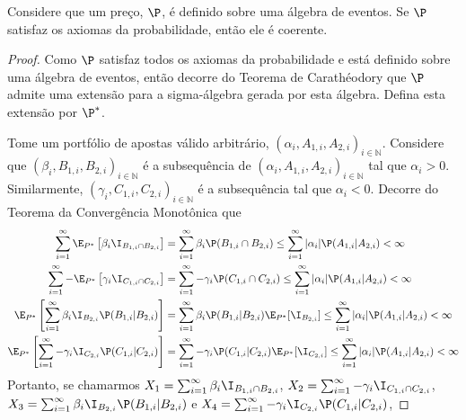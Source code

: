 \begin{lemma}
 \label{lemma:coherence_countable}
 Considere que um preço, $\P$, é 
 definido sobre uma álgebra de eventos.
 Se $\P$ satisfaz os axiomas da probabilidade, então 
 ele é coerente.
\end{lemma}

\begin{proof}
 Como $\P$ satisfaz todos os axiomas da probabilidade e
 está definido sobre uma álgebra de eventos, 
 então decorre do Teorema de Carathéodory
 \citep{Billingsley1986} que 
 $\P$ admite uma extensão para 
 a sigma-álgebra gerada por esta álgebra.
 Defina esta extensão por $\P^{*}$.
 
 Tome um portfólio de apostas válido arbitrário,
 $(\alpha_{i},A_{1,i},A_{2,i})_{i \in \mathbb{N}}$.
 Considere que 
 $(\beta_{i},B_{1,i},B_{2,i})_{i \in \mathbb{N}}$ é 
 a subsequência de 
 $(\alpha_{i},A_{1,i},A_{2,i})_{i \in \mathbb{N}}$ 
 tal que $\alpha_{i} > 0$.
 Similarmente, 
 $(\gamma_{i},C_{1,i},C_{2,i})_{i \in \mathbb{N}}$ 
 é a subsequência tal que $\alpha_{i} < 0$.
 Decorre do Teorema da Convergência Monotônica 
 \citep[p.211]{Billingsley1986} que
 \begin{align*}
  \sum_{i=1}^{\infty}{\E_{P^{*}}\left[\beta_{i}\I_{B_{1,i} \cap B_{2,i}}\right]}
  &= \sum_{i=1}^{\infty}{\beta_{i}\P(B_{1,i} \cap B_{2,i})}
  \leq \sum_{i=1}^{\infty}{|\alpha_{i}|\P(A_{1,i}|A_{2,i})} < \infty \\
  \sum_{i=1}^{\infty}{-\E_{P^{*}}\left[\gamma_{i} \I_{C_{1,i} \cap C_{2,i}}\right]} 
  &= \sum_{i=1}^{\infty}{-\gamma_{i}\P(C_{1,i} \cap C_{2,i})} 
  \leq \sum_{i=1}^{\infty}{|\alpha_{i}|\P(A_{1,i}|A_{2,i})} < \infty \\
  \E_{P^{*}}\left[\sum_{i=1}^{\infty}{\beta_{i}\I_{B_{2,i}}\P(B_{1,i}|B_{2,i})}\right]
  &= \sum_{i=1}^{\infty}{\beta_{i}\P(B_{1,i}|B_{2,i})\E_{P^{*}}[\I_{B_{2,i}}]}
  \leq \sum_{i=1}^{\infty}{|\alpha_{i}|\P(A_{1,i}|A_{2,i})} < \infty \\
  \E_{P^{*}}\left[\sum_{i=1}^{\infty}{-\gamma_{i}\I_{C_{2,i}}\P(C_{1,i}|C_{2,i})}\right]
  &= \sum_{i=1}^{\infty}{-\gamma_{i}\P(C_{1,i}|C_{2,i})\E_{P^{*}}[\I_{C_{2,i}}]}
  \leq \sum_{i=1}^{\infty}{|\alpha_{i}|\P(A_{1,i}|A_{2,i})} < \infty
 \end{align*}
 Portanto, se chamarmos $X_{1} = \sum_{i=1}^{\infty}{\beta_{i}\I_{B_{1,i} \cap B_{2,i}}}$, 
 $X_{2} = \sum_{i=1}^{\infty}{-\gamma_{i}\I_{C_{1,i} \cap C_{2,i}}}$,
 $X_{3} = \sum_{i=1}^{\infty}{\beta_{i}\I_{B_{2,i}}\P(B_{1,i}|B_{2,i})}$ e
 $X_{4} = \sum_{i=1}^{\infty}{-\gamma_{i}\I_{C_{2,i}}\P(C_{1,i}|C_{2,i})}$,

\end{proof}
